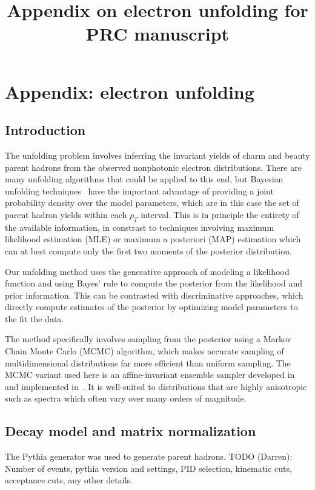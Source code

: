 \documentclass[12pt]{article}
\title{\sffamily\bfseries{Appendix on electron unfolding for PRC manuscript}}
\author{\sffamily{Andrew Adare}}
\date{\sffamily{\today}}
\begin{document}
\maketitle

\section{Appendix: electron unfolding}

\subsection{Introduction}
The unfolding problem involves inferring the invariant yields of charm and beauty parent hadrons from the observed nonphotonic electron distributions. There are many unfolding algorithms that could be applied to this end, but Bayesian unfolding techniques~\cite{Choudalakis:2012hz} have the important advantage of providing a joint probability density over the model parameters, which are in this case the set of parent hadron yields within each $p_T$ interval. This is in principle the entirety of the available information, in constrast to techniques involving maximum likelihood estimation (MLE) or maximum a posteriori (MAP) estimation which can at best compute only the first two moments of the posterior distribution.

Our unfolding method uses the generative approach of modeling a likelihood function and using Bayes' rule to compute the posterior from the likelihood and prior information. This can be contrasted with discriminative approaches, which directly compute estimates of the posterior by optimizing model parameters to the fit the data.

The method specifically involves sampling from the posterior using a
Markov Chain Monte Carlo (MCMC) algorithm, which makes accurate sampling of multidimensional distributions far more efficient than uniform sampling. The MCMC variant used here is an affine-invariant ensemble sampler developed in~\cite{goodman2010} and implemented in~\cite{dfm2013}. It is well-suited to distributions that are highly anisotropic such as spectra which often vary over many orders of magnitude.

\subsection{Decay model and matrix normalization}
The Pythia generator was used to generate parent hadrons. TODO (Darren): Number of events, pythia version and settings, PID selection, kinematic cuts, acceptance cuts, any other details.
\end{document}
